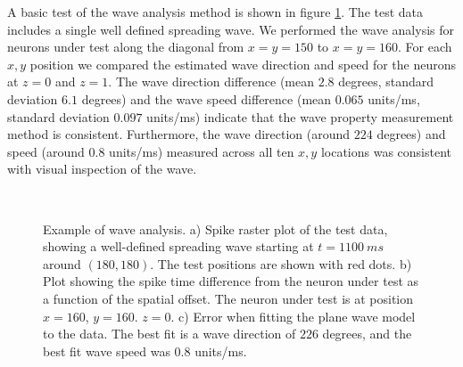 \documentclass[12pt]{article}
\begin{document}
A basic test of the wave analysis method is shown in figure \ref{fig:WavePropTest}.
The test data includes a single well defined spreading wave.
We performed the wave analysis for neurons under test along the diagonal from $x=y=150$ to $x=y=160$.
For each $x,y$ position we compared the estimated wave direction and speed for the neurons at $z=0$ and $z=1$.
The wave direction difference (mean $2.8$ degrees, standard deviation $6.1$ degrees) and the wave speed difference (mean $0.065$ units/ms, standard deviation $0.097$ units/ms)
indicate that the wave property measurement method is consistent.
Furthermore, the wave direction (around $224$ degrees) and speed (around $0.8$ units/ms) measured across all ten $x,y$ locations was consistent with visual inspection of the wave.

\begin{figure}[!htb]
 \caption{Example of wave analysis.
          a) Spike raster plot of the test data, showing a well-defined spreading wave starting at $t=1100~ms$ around $(180,180)$.
             The test positions are shown with red dots.
          b) Plot showing the spike time difference from the neuron under test as a function of the spatial offset. The neuron under test is at position $x=160$, $y=160$. $z=0$.
          c) Error when fitting the plane wave model to the data. The best fit is a wave direction of $226$ degrees, and the best fit wave speed was $0.8$ units/ms.
          } 
      \\
 \label{fig:WavePropTest}
\end{figure}
\FloatBarrier
\end{document}
